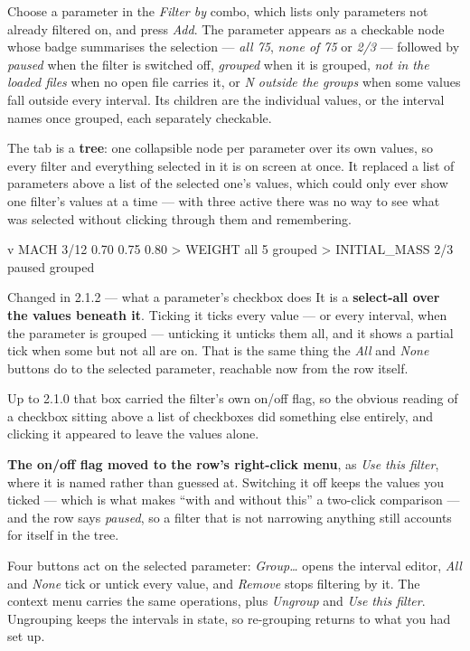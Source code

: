 \documentclass[11pt,a4paper,oneside]{report}
\newcommand{\appver}{2.1.2}
\begin{document}
Choose a parameter in the \emph{Filter by} combo, which lists only parameters not
already filtered on, and press \emph{Add}. The parameter appears as a checkable
node whose badge summarises the selection --- \emph{all 75}, \emph{none of 75} or
\emph{2/3} --- followed by \emph{paused} when the filter is switched off,
\emph{grouped} when it is grouped, \emph{not in the loaded files} when no open
file carries it, or \emph{N outside the groups} when some values fall outside
every interval. Its children are the individual values, or the interval names
once grouped, each separately checkable.

The tab is a \textbf{tree}: one collapsible node per parameter over its own
values, so every filter and everything selected in it is on screen at once. It
replaced a list of parameters above a list of the selected one's values, which
could only ever show one filter's values at a time --- with three active there
was no way to see what was selected without clicking through them and
remembering.

\begin{aoecode}
 v MACH      3/12
     0.70
     0.75
     0.80
 > WEIGHT    all 5   grouped
 > INITIAL_MASS   2/3   paused   grouped
\end{aoecode}

\begin{aoenew}{Changed in \appver{} --- what a parameter's checkbox does}
It is a \textbf{select-all over the values beneath it}. Ticking it ticks every
value --- or every interval, when the parameter is grouped --- unticking it
unticks them all, and it shows a partial tick when some but not all are on.
That is the same thing the \emph{All} and \emph{None} buttons do to the selected
parameter, reachable now from the row itself.

Up to 2.1.0 that box carried the filter's own on/off flag, so the obvious
reading of a checkbox sitting above a list of checkboxes did something else
entirely, and clicking it appeared to leave the values alone.

\textbf{The on/off flag moved to the row's right-click menu}, as \emph{Use this
filter}, where it is named rather than guessed at. Switching it off keeps the
values you ticked --- which is what makes ``with and without this'' a two-click
comparison --- and the row says \emph{paused}, so a filter that is not narrowing
anything still accounts for itself in the tree.
\end{aoenew}

Four buttons act on the selected parameter: \emph{Group\ldots} opens the interval
editor, \emph{All} and \emph{None} tick or untick every value, and \emph{Remove}
stops filtering by it. The context menu carries the same operations, plus
\emph{Ungroup} and \emph{Use this filter}. Ungrouping keeps the intervals in
state, so re-grouping returns to what you had set up.
\end{document}
